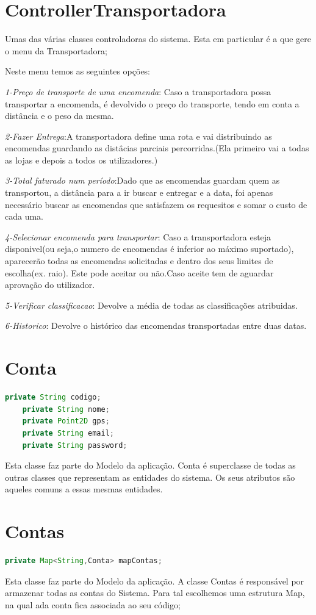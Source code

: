 \documentclass[a4paper]{report}
\begin{document}
	\section{ControllerTransportadora}
	 Umas das várias classes controladoras do sistema. Esta em particular é a que gere o menu da Transportadora;
	 
	 Neste menu temos as seguintes opções:
	 
	 \textit{1-Preço de transporte de uma encomenda}: Caso a transportadora possa transportar a encomenda, é devolvido o preço do transporte, tendo em conta a distância e o peso da mesma.
	 
	  \textit{2-Fazer Entrega}:A transportadora define uma rota e vai distribuindo as encomendas guardando as distâcias parciais percorridas.(Ela primeiro vai a todas as lojas e depois a todos os utilizadores.)
	  
	  \textit{3-Total faturado num período}:Dado que as encomendas guardam quem as transportou, a distância para a ir buscar e entregar e a data, foi apenas necessário buscar as encomendas que satisfazem os requesitos e somar o custo de cada uma.
	 
	 \textit{4-Selecionar encomenda para transportar}: Caso a transportadora esteja disponivel(ou seja,o numero de encomendas é inferior ao máximo suportado), aparecerão todas as encomendas solicitadas e dentro dos seus limites de escolha(ex. raio). Este pode aceitar ou não.Caso aceite tem de aguardar aprovação do utilizador.
	 
	\textit{5-Verificar classificacao}: Devolve a média de todas as classificações atribuidas.
	 
	 \textit{6-Historico}: Devolve o histórico das encomendas transportadas entre duas datas.
	
	\section{Conta}
	\begin{lstlisting}[language=Java]
	private String codigo;
	private String nome;
	private Point2D gps;
	private String email;
	private String password;
	\end{lstlisting}
	Esta classe faz parte do Modelo da aplicação. Conta é superclasse de todas as outras classes que representam as entidades do sistema. Os seus atributos são aqueles comuns a essas mesmas entidades.
	
	\section{Contas}
	\begin{lstlisting}[language=Java]
	private Map<String,Conta> mapContas;
	\end{lstlisting}
	Esta classe faz parte do Modelo da aplicação. A classe Contas é responsável por armazenar todas as contas do Sistema. Para tal escolhemos uma estrutura Map, na qual ada conta fica associada ao seu código;
	
\end{document}
